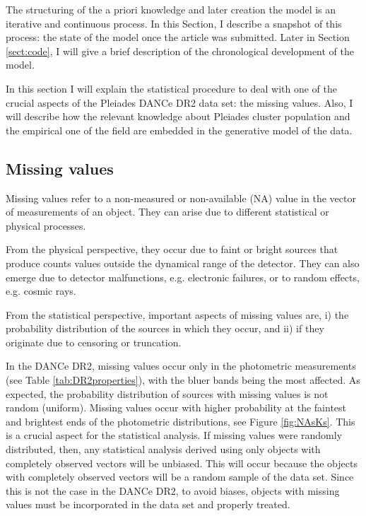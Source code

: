 The structuring of the a priori knowledge and later creation the model is an iterative and continuous process.  In this Section, I describe a snapshot of this process: the state of the model once the article \citet{Olivares2017} was submitted. Later in Section \ref{sect:code}, I will give a brief description of the chronological development of the model.

In this section I will explain the statistical procedure to deal with one of the crucial aspects of the Pleiades DANCe DR2 data set: the missing values. Also, I will describe how the relevant knowledge about Pleiades cluster population and the empirical one of the field are embedded in the generative model of the data.

\subsection{Missing values}
\label{sect:missing}

Missing values refer to a non-measured or non-available (NA) value in the vector of measurements of an object. They can arise due to different statistical or physical processes. 

From the physical perspective, they occur due to faint or bright sources that produce counts values outside the dynamical range of the detector. They can also emerge due to detector malfunctions, e.g. electronic failures, or to random effects, e.g. cosmic rays. 

From the statistical perspective, important aspects of missing values are, i) the probability distribution of the sources in which they occur, and ii) if they originate due to censoring or truncation. 

In the DANCe DR2, missing values occur only in the photometric measurements (see Table \ref{tab:DR2properties}), with the bluer bands being the most affected. As expected, the probability distribution of sources with missing values is not random (uniform). Missing values occur with higher probability at the faintest and brightest ends of the photometric distributions, see Figure \ref{fig:NAsKs}. This is a crucial aspect for the statistical analysis. If missing values were randomly distributed, then, any statistical analysis derived using only objects with completely observed vectors will be unbiased. This will occur because the objects with completely observed vectors will be a random sample of the data set. Since this is not the case in the DANCe DR2, to avoid biases, objects with missing values must be incorporated in the data set and properly treated. 


